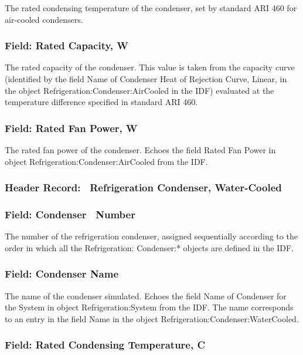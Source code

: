 The rated condensing temperature of the condenser, set by standard ARI 460 for air-cooled condensers.

\subsubsection{Field: Rated Capacity, W}\label{field-rated-capacity-w}

The rated capacity of the condenser. This value is taken from the capacity curve (identified by the field Name of Condenser Heat of Rejection Curve, Linear, in the object Refrigeration:Condenser:AirCooled in the IDF) evaluated at the temperature difference specified in standard ARI 460.

\subsubsection{Field: Rated Fan Power, W}\label{field-rated-fan-power-w}

The rated fan power of the condenser. Echoes the field Rated Fan Power in object Refrigeration:Condenser:AirCooled from the IDF.

\subsubsection{Header Record:~ Refrigeration Condenser, Water-Cooled}\label{header-record-refrigeration-condenser-water-cooled}

\subsubsection{Field: Condenser~ Number}\label{field-condenser-number-2}

The number of the refrigeration condenser, assigned sequentially according to the order in which all the Refrigeration: Condenser:* objects are defined in the IDF.

\subsubsection{Field: Condenser Name}\label{field-condenser-name-2}

The name of the condenser simulated. Echoes the field Name of Condenser for the System in object Refrigeration:System from the IDF. The name corresponds to an entry in the field Name in the object Refrigeration:Condenser:WaterCooled.

\subsubsection{Field: Rated Condensing Temperature, C}\label{field-rated-condensing-temperature-c-1}

